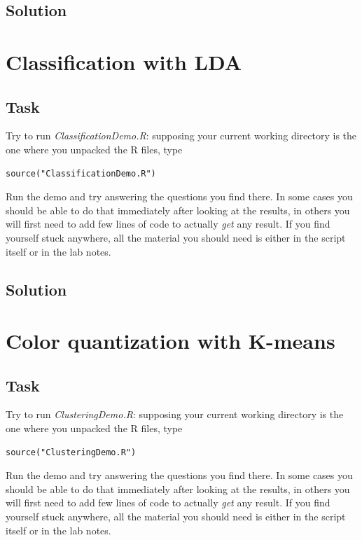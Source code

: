 \documentclass[a4paper,12pt,titlepage]{article} %
\begin{document}
\subsection{Solution}


\newpage
\section{Classification with LDA}
\subsection{Task}
Try to run \textit{ClassificationDemo.R}: supposing your current working directory is the one where you unpacked the R files, type
\begin{verbatim}
source("ClassificationDemo.R")
\end{verbatim}

Run the demo and try answering the questions you find there. In some cases you should be able to do that immediately after looking at the results, in others you will first need to add few lines of code to actually \textit{get} any result. If you find yourself stuck anywhere, all the material you should need is either in the script itself or in the lab notes.


\subsection{Solution}

\newpage
\section{Color quantization with K-means}
\subsection{Task}
Try to run \textit{ClusteringDemo.R}: supposing your current working directory is the one where you unpacked the R files, type
\begin{verbatim}
source("ClusteringDemo.R")
\end{verbatim}

Run the demo and try answering the questions you find there. In some cases you should be able to do that immediately after looking at the results, in others you will first need to add few lines of code to actually \textit{get} any result. If you find yourself stuck anywhere, all the material you should need is either in the script itself or in the lab notes.
\end{document}
